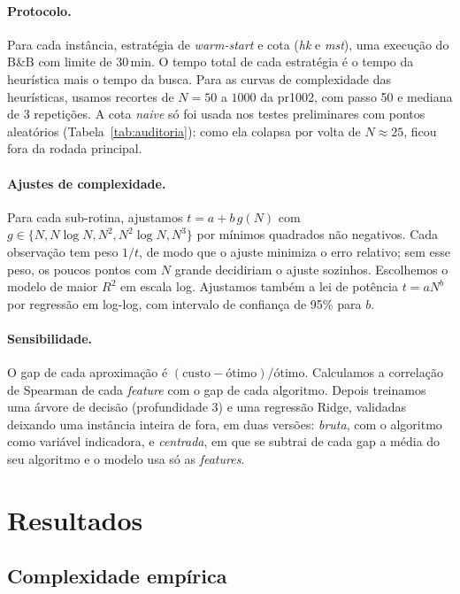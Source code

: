 \documentclass[12pt]{article}
\begin{document}
\paragraph{Protocolo.} Para cada instância, estratégia de \textit{warm-start} e cota
(\textit{hk} e \textit{mst}), uma execução do B\&B com limite de 30\,min. O tempo total
de cada estratégia é o tempo da heurística mais o tempo da busca. Para as curvas de
complexidade das heurísticas, usamos recortes de $N=50$ a $1000$ da pr1002, com passo
50 e mediana de 3 repetições. A cota \textit{naive} só foi usada nos testes preliminares
com pontos aleatórios (Tabela~\ref{tab:auditoria}): como ela colapsa por volta de
$N \approx 25$, ficou fora da rodada principal.

\paragraph{Ajustes de complexidade.} Para cada sub-rotina, ajustamos
$t = a + b\,g(N)$ com $g \in \{N, N\log N, N^2, N^2\log N, N^3\}$ por mínimos quadrados
não negativos. Cada observação tem peso $1/t$, de modo que o ajuste minimiza o erro
relativo; sem esse peso, os poucos pontos com $N$ grande decidiriam o ajuste sozinhos.
Escolhemos o modelo de maior $R^2$ em escala log. Ajustamos também a lei de potência
$t = aN^b$ por regressão em log-log, com intervalo de confiança de 95\% para $b$.

\paragraph{Sensibilidade.} O gap de cada aproximação é $(\text{custo} -
\text{ótimo})/\text{ótimo}$. Calculamos a correlação de Spearman de cada
\textit{feature} com o gap de cada algoritmo. Depois treinamos uma árvore de decisão
(profundidade 3) e uma regressão Ridge, validadas deixando uma instância inteira de
fora, em duas versões: \emph{bruta}, com o algoritmo como variável indicadora, e
\emph{centrada}, em que se subtrai de cada gap a média do seu algoritmo e o modelo usa só
as \textit{features}.

\section{Resultados}\label{sec:res}

\subsection{Complexidade empírica}
\end{document}
